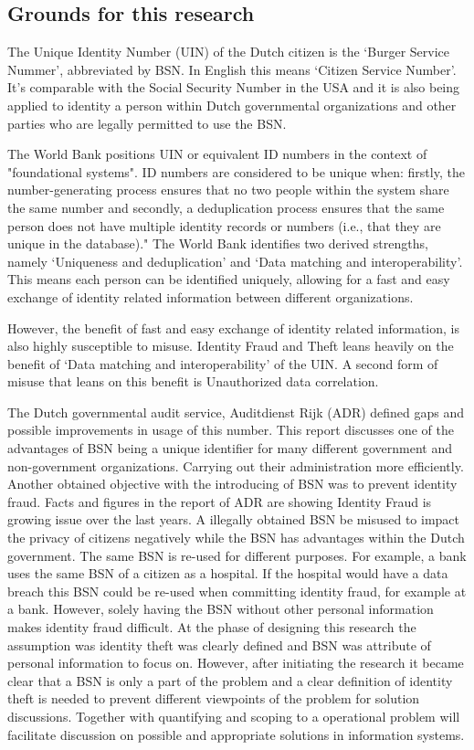 \subsection{Grounds for this research}
The Unique Identity Number (UIN) of the Dutch citizen is the ‘Burger Service Nummer’, abbreviated by BSN. In English this means ‘Citizen Service Number’. It’s comparable with the Social Security Number in the USA and it is also being applied to identity a person within Dutch governmental organizations and other parties who are legally permitted to use the BSN. \par
The World Bank \cite{WorldBank_UIN} positions UIN or equivalent ID numbers in the context of "foundational systems". ID numbers are considered to be unique when: firstly, the number-generating process ensures that no two people within the system share the same number and secondly, a deduplication process ensures that the same person does not have multiple identity records or numbers (i.e., that they are unique in the database)." The World Bank identifies two derived strengths, namely ‘Uniqueness and deduplication’ and ‘Data matching and interoperability’. This means each person can be identified uniquely, allowing for a fast and easy exchange of identity related information between different organizations.\par 
However, the benefit of fast and easy exchange of identity related information, is also highly susceptible to misuse. Identity Fraud and Theft leans heavily on the benefit of ‘Data matching and interoperability’ of the UIN. A second form of misuse that leans on this benefit is Unauthorized data correlation. \par
The Dutch governmental audit service, Auditdienst Rijk (ADR) defined gaps and possible improvements in usage of this number\cite{ADR}. This report discusses one of the advantages of BSN being a unique identifier for many different government and non-government organizations. Carrying out their administration more efficiently. Another obtained objective with the introducing of BSN was to prevent identity fraud. Facts and figures in the report of ADR are showing Identity Fraud is growing issue over the last years. A illegally obtained BSN be misused to impact the privacy of citizens negatively while the BSN has advantages within the Dutch government. The same BSN is re-used for different purposes. For example, a bank uses the same BSN of a citizen as a hospital. If the hospital would have a data breach this BSN could be re-used when committing identity fraud, for example at a bank. However, solely having the BSN without other personal information makes identity fraud difficult. At the phase of designing this research the assumption was identity theft was clearly defined and BSN was attribute of personal information to focus on. However, after initiating the research it became clear that a BSN is only a part of the problem and a clear definition of identity theft is needed to prevent different viewpoints of the problem for solution discussions. Together with quantifying and scoping to a operational problem will facilitate discussion on possible and appropriate solutions in information systems. \par

